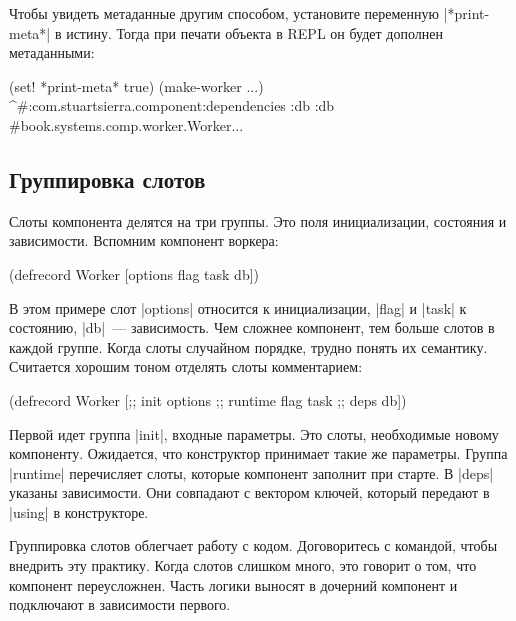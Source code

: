 Чтобы увидеть метаданные другим способом, установите переменную
\spverb|*print-meta*| в истину. Тогда при печати объекта в REPL он будет
дополнен метаданными:

\begin{english}
  \begin{clojure}
(set! *print-meta* true)
(make-worker {...})
^#:com.stuartsierra.component{:dependencies {:db :db}}
#book.systems.comp.worker.Worker{...}
  \end{clojure}
\end{english}

\subsection{Группировка слотов}

Слоты компонента делятся на три группы. Это поля инициализации, состояния и
зависимости. Вспомним компонент воркера:

\begin{english}
  \begin{clojure}
(defrecord Worker
    [options flag task db])
  \end{clojure}
\end{english}

В этом примере слот \spverb|options| относится к инициализации, \spverb|flag| и
\spverb|task| к состоянию, \spverb|db|~--- зависимость. Чем сложнее компонент,
тем больше слотов в каждой группе. Когда слоты случайном порядке, трудно понять
их семантику. Считается хорошим тоном отделять слоты комментарием:

\begin{english}
  \begin{clojure}
(defrecord Worker
    [;; init
     options
     ;; runtime
     flag
     task
     ;; deps
     db])
  \end{clojure}
\end{english}

Первой идет группа \spverb|init|, входные параметры. Это слоты, необходимые
новому компоненту. Ожидается, что конструктор принимает такие же
параметры. Группа \spverb|runtime| перечисляет слоты, которые компонент заполнит
при старте. В \spverb|deps| указаны зависимости. Они совпадают с вектором
ключей, который передают в \spverb|using| в конструкторе.

Группировка слотов облегчает работу с кодом. Договоритесь с командой, чтобы
внедрить эту практику. Когда слотов слишком много, это говорит о том, что
компонент переусложнен. Часть логики выносят в дочерний компонент и подключают в
зависимости первого.

